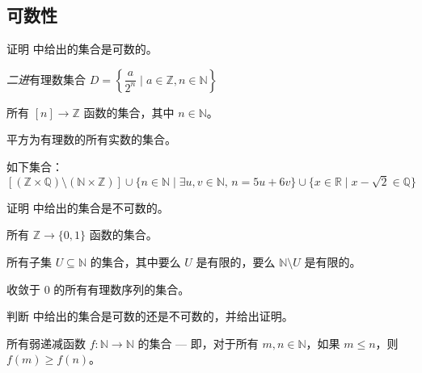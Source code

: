 \subsection*{可数性}

证明  中给出的集合是可数的。

\begin{chapex}
\label{cqProveCountableBegin}
\textit{二进}有理数集合 $D = \left\{ \dfrac{a}{2^n} \mid a \in \mathbb{Z}, n \in \mathbb{N} \right\}$
\end{chapex}

\begin{chapex}
所有 $[n] \to \mathbb{Z}$ 函数的集合，其中 $n \in \mathbb{N}$。
\end{chapex}

\begin{chapex}
平方为有理数的所有实数的集合。
\end{chapex}

\begin{chapex}
\label{cqProveCountableEnd}
如下集合：
\[
[(\mathbb{Z} \times \mathbb{Q}) \setminus (\mathbb{N} \times \mathbb{Z})] \cup \{ n \in \mathbb{N} \mid \exists u,v \in \mathbb{N},\, n=5u+6v \} \cup \{ x \in \mathbb{R} \mid x-\sqrt{2} \in \mathbb{Q} \}
\]
\end{chapex}

证明  中给出的集合是不可数的。

\begin{chapex}
\label{cqProveUncountableBegin}
所有 $\mathbb{Z} \to \{ 0,1 \}$ 函数的集合。
\end{chapex}

\begin{chapex}
所有子集 $U \subseteq \mathbb{N}$ 的集合，其中要么 $U$ 是有限的，要么 $\mathbb{N} \setminus U$ 是有限的。
\end{chapex}

\begin{chapex}
\label{cqProveUncountableEnd}
收敛于 $0$ 的所有有理数序列的集合。
\end{chapex}

判断  中给出的集合是可数的还是不可数的，并给出证明。

\begin{chapex}
\label{cqDetermineIfCountableBegin}
所有弱递减函数 $f : \mathbb{N} \to \mathbb{N}$ 的集合 --- 即，对于所有 $m,n \in \mathbb{N}$，如果 $m \le n$，则 $f(m) \ge f(n)$。
\end{chapex}

